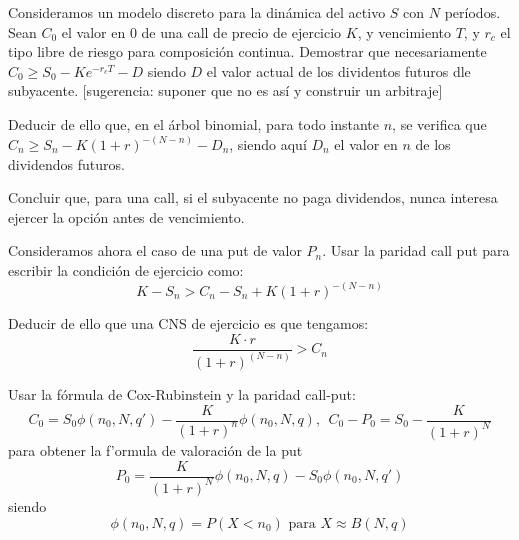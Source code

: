 \begin{problem}[5]
Consideramos un modelo discreto para la dinámica del activo $S$ con $N$ períodos. Sean $C_0$ el valor en 0 de una call de precio de ejercicio $K$, y vencimiento $T$, y $r_c$ el tipo libre de riesgo para composición continua.
\ppart Demostrar que necesariamente $C_0\geq S_0-Ke^{-r_cT}-D$ siendo $D$ el valor actual de los dividentos futuros dle subyacente. [sugerencia: suponer que no es así y construir un arbitraje]

\ppart Deducir de ello que, en el árbol binomial, para todo instante $n$, se verifica que $C_n\geq S_n-K(1+r)^{-(N-n)}-D_n$, siendo aquí $D_n$ el valor en $n$ de los dividendos futuros.

\ppart Concluir que, para una call, si el subyacente no paga dividendos, nunca interesa ejercer la opción antes de vencimiento.

\ppart Consideramos ahora el caso de una put de valor $P_n$. Usar la paridad call put para escribir la condición de ejercicio como:
\[K-S_n > C_n-S_n + K(1+r)^{-(N-n)}\]

\ppart Deducir de ello que una CNS de ejercicio es que tengamos:
\[\frac{K\cdot r}{(1+r)^{(N-n)}}> C_n\]
\solution

\end{problem}

\begin{problem}[6]
Usar la fórmula de Cox-Rubinstein y la paridad call-put:
\[C_0=S_0 \phi(n_0,N,q')-\frac{K}{(1+r)^n}\phi(n_0,N,q), \ \ C_0-P_0=S_0-\frac{K}{(1+r)^N}\]
para obtener la f'ormula de valoración de la put
\[P_0=\frac{K}{(1+r)^N}\phi(n_0,N,q)-S_0\phi(n_0,N,q')\]
siendo
\[\phi(n_0,N,q)=P(X<n_0) \text{ para } X \approx B(N,q)\]
\solution

\end{problem}
